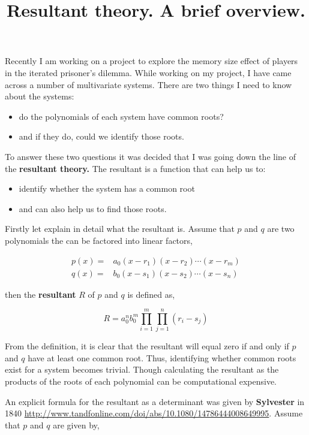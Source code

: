 \documentclass{article}
\title{Resultant theory. A brief overview.}
\begin{document}
\maketitle

Recently I am working on a project to explore the memory size effect of players
in the iterated prisoner's dilemma. While working on my project, I have came
across a number of multivariate systems. There are two things I need to know
about the systems:

\begin{itemize}
    \item do the polynomials of each system have common roots?
    \item and if they do, could we identify those roots.
\end{itemize}

To answer these two questions it was decided that I was going down the line of
the \textbf{resultant theory.} The resultant is a function that can help us 
to:

\begin{itemize}
    \item identify whether the system has a common root
    \item and can also help us to find those roots.
\end{itemize}

Firstly let explain in detail what the resultant is. Assume that \(p\) and \(q\)
are two polynomials the can be factored into linear factors,

\begin{eqnarray*}
    p(x) = & a_{0} (x - r_{1}) (x - r_{2}) \cdots (x - r_{m}) \\
    q(x) = & b_{0} (x - s_{1}) (x - s_{2}) \cdots (x - s_{n})
\end{eqnarray*}

then the \textbf{resultant} \(R\) of \(p\) and \(q\) is defined as,

\begin{equation*}
    R =a_{0}^{n}b_{0}^{m}\prod_{{i=1}}^{m}\prod_{{j=1}}^{n}(r_{i}-s_{j})
\end{equation*}

From the definition, it is clear that the resultant will equal zero if and only
if \(p\) and \(q\) have at least one common root. Thus, identifying whether
common roots exist for a system becomes trivial. Though calculating the resultant
as the products of the roots of each polynomial can be computational expensive.

An explicit formula for the resultant as a determinant was given by \textbf{Sylvester} in 1840
\url{http://www.tandfonline.com/doi/abs/10.1080/14786444008649995}. Assume that
\(p\) and \(q\) are given by,
\end{document}
